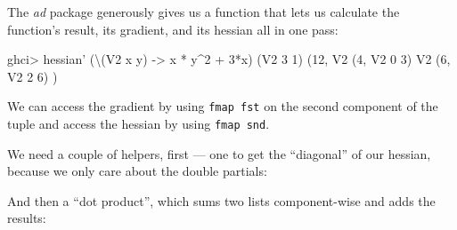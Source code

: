 \documentclass[]{article}
\newenvironment{Shaded}{}{}
\newcommand{\KeywordTok}[1]{\textcolor[rgb]{0.00,0.44,0.13}{\textbf{{#1}}}}
\newcommand{\DataTypeTok}[1]{\textcolor[rgb]{0.56,0.13,0.00}{{#1}}}
\newcommand{\DecValTok}[1]{\textcolor[rgb]{0.25,0.63,0.44}{{#1}}}
\newcommand{\CommentTok}[1]{\textcolor[rgb]{0.38,0.63,0.69}{\textit{{#1}}}}
\newcommand{\OtherTok}[1]{\textcolor[rgb]{0.00,0.44,0.13}{{#1}}}
\newcommand{\FunctionTok}[1]{\textcolor[rgb]{0.02,0.16,0.49}{{#1}}}
\newcommand{\NormalTok}[1]{{#1}}
\begin{document}
The \emph{ad} package generously gives us a function that lets us
calculate the function's result, its gradient, and its hessian all in
one pass:

\begin{Shaded}
\begin{Highlighting}[]
\NormalTok{ghci}\FunctionTok{>} \NormalTok{hessian' (\textbackslash{}(}\DataTypeTok{V2} \NormalTok{x y) }\OtherTok{->} \NormalTok{x }\FunctionTok{*} \NormalTok{y}\FunctionTok{^}\DecValTok{2} \FunctionTok{+} \DecValTok{3}\FunctionTok{*}\NormalTok{x) (}\DataTypeTok{V2} \DecValTok{3} \DecValTok{1}\NormalTok{)}
\NormalTok{(}\DecValTok{12}\NormalTok{, }\DataTypeTok{V2} \NormalTok{(}\DecValTok{4}\NormalTok{, }\DataTypeTok{V2} \DecValTok{0} \DecValTok{3}\NormalTok{)}
     \DataTypeTok{V2} \NormalTok{(}\DecValTok{6}\NormalTok{, }\DataTypeTok{V2} \DecValTok{2} \DecValTok{6}\NormalTok{)}
\NormalTok{)}
\end{Highlighting}
\end{Shaded}

We can access the gradient by using \texttt{fmap\ fst} on the second
component of the tuple and access the hessian by using
\texttt{fmap\ snd}.

We need a couple of helpers, first --- one to get the ``diagonal'' of
our hessian, because we only care about the double partials:

\begin{Shaded}
\end{Shaded}

And then a ``dot product'', which sums two lists component-wise and adds
the results:
\end{document}

